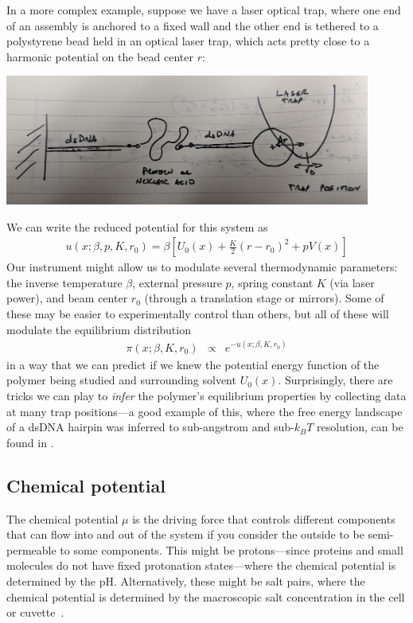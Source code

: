\documentclass[english,course]{lecture}
\begin{document}
In a more complex example, suppose we have a laser optical trap, where one end of an assembly is anchored to a fixed wall and the other end is tethered to a polystyrene bead held in an optical laser trap, which acts pretty close to a harmonic potential on the bead center $r$:

\begin{centering}
\includegraphics[width=0.9\textwidth]{figures/single-optical-trap.jpg}

\end{centering}

We can write the reduced potential for this system as
\begin{eqnarray}
u(x; \beta, p, K, r_0) = \beta \left[ U_0(x) + \frac{K}{2} (r - r_0)^2 + p V(x) \right]
\end{eqnarray}
Our instrument might allow us to modulate several thermodynamic parameters: the inverse temperature $\beta$, external pressure $p$, spring constant $K$ (via laser power), and beam center $r_0$ (through a translation stage or mirrors).
Some of these may be easier to experimentally control than others, but all of these will modulate the equilibrium distribution
\begin{eqnarray}
\pi(x; \beta, K, r_0) &\propto& e^{-u(x; \beta, K, r_0)}
\end{eqnarray}
in a way that we can predict if we knew the potential energy function of the polymer being studied and surrounding solvent $U_0(x)$.
Surprisingly, there are tricks we can play to \emph{infer} the polymer's equilibrium properties by collecting data at many trap positions---a good example of this, where the free energy landscape of a dsDNA hairpin was inferred to sub-angstrom and sub-$k_B T$ resolution, can be found in \cite{shirts2008statistically}.

\subsection{Chemical potential}

The chemical potential $\mu$ is the driving force that controls different components that can flow into and out of the system if you consider the outside to be semi-permeable to some components.
This might be protons---since proteins and small molecules do not have fixed protonation states---where the chemical potential is determined by the pH.
Alternatively, these might be salt pairs, where the chemical potential is determined by the macroscopic salt concentration in the cell or cuvette~\cite{ross2018biomolecular}.
\end{document}
